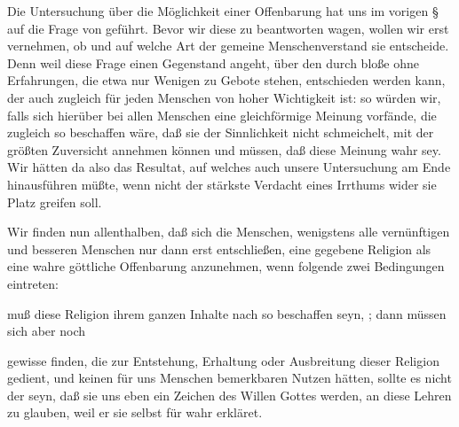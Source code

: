 \begin{aufza}
\item Die Untersuchung über die Möglichkeit einer Offenbarung hat uns im vorigen § auf die Frage von  geführt. Bevor wir diese zu beantworten wagen, wollen wir erst vernehmen, ob und auf welche Art der gemeine Menschenverstand sie entscheide. Denn weil diese Frage einen Gegenstand angeht, über den durch bloße  ohne Erfahrungen, die etwa nur Wenigen zu Gebote stehen, entschieden werden kann, der auch zugleich für jeden Menschen von hoher Wichtigkeit ist: so würden wir, falls sich hierüber bei allen Menschen eine gleichförmige Meinung vorfände, die zugleich so beschaffen wäre, daß sie der Sinnlichkeit nicht schmeichelt, mit der größten Zuversicht annehmen können und müssen, daß diese Meinung wahr sey. Wir hätten da also das Resultat, auf welches auch unsere Untersuchung am Ende hinausführen müßte, wenn nicht der stärkste Verdacht eines Irrthums wider sie Platz greifen soll.
\item Wir finden nun allenthalben, daß sich die Menschen, wenigstens alle vernünftigen und besseren Menschen nur dann erst entschließen, eine gegebene Religion als eine wahre göttliche Offenbarung anzunehmen, wenn folgende zwei Bedingungen eintreten: 
\end{aufza}\par
{} muß diese Religion ihrem ganzen Inhalte nach so beschaffen seyn, ; dann müssen sich aber noch\par
{} gewisse  finden, die zur Entstehung, Erhaltung oder Ausbreitung dieser Religion gedient, und keinen für uns Menschen bemerkbaren Nutzen hätten, sollte es nicht der seyn, daß sie uns eben ein Zeichen des Willen Gottes werden, an diese Lehren zu glauben, weil er sie selbst für wahr erkläret.
